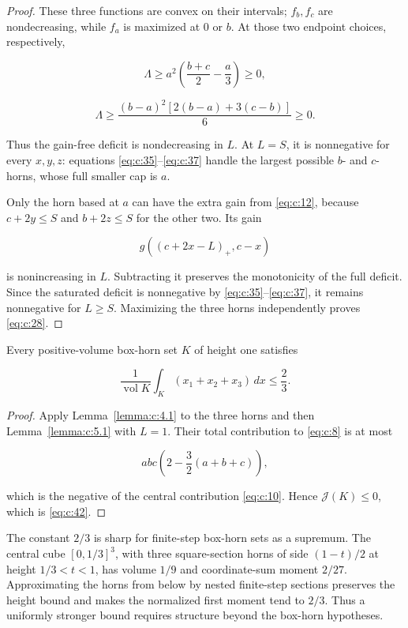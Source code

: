 \begin{proof}
These three functions are convex on their intervals; \(f_b,f_c\) are
nondecreasing, while \(f_a\) is maximized at \(0\) or \(b\). At those two
endpoint choices, respectively,

\[
\Lambda\ge
a^2\left(\frac{b+c}{2}-\frac a3\right)\ge0,
\]

\begin{equation}
\Lambda\ge
\frac{(b-a)^2[2(b-a)+3(c-b)]}{6}\ge0.
\label{eq:c:41}
\end{equation}

Thus the gain-free deficit is nondecreasing in \(L\). At \(L=S\), it is
nonnegative for every \(x,y,z\): equations \eqref{eq:c:35}--\eqref{eq:c:37} handle the largest
possible \(b\)- and \(c\)-horns, whose full smaller cap is \(a\).

Only the horn based at \(a\) can have the extra gain from \eqref{eq:c:12}, because
\(c+2y\le S\) and \(b+2z\le S\) for the other two. Its gain

\[
g((c+2x-L)_+,c-x)
\]

is nonincreasing in \(L\). Subtracting it preserves the monotonicity of the
full deficit. Since the saturated deficit is nonnegative by \eqref{eq:c:35}--\eqref{eq:c:37}, it
remains nonnegative for \(L\ge S\). Maximizing the three horns independently
proves \eqref{eq:c:28}.
\end{proof}

\begin{theorem}\label{theorem:c:5.2}

Every positive-volume box-horn set \(K\) of height one satisfies

\begin{equation}
\boxed{
\frac1{\operatorname{vol}K}
\int_K(x_1+x_2+x_3)\,dx\le\frac23.
}
\label{eq:c:42}
\end{equation}

\end{theorem}
\begin{proof}

Apply Lemma~\ref{lemma:c:4.1} to the three horns and then Lemma~\ref{lemma:c:5.1} with \(L=1\).
Their total contribution to \eqref{eq:c:8} is at most

\[
abc\left(2-\frac32(a+b+c)\right),
\]

which is the negative of the central contribution \eqref{eq:c:10}. Hence
\(\mathcal J(K)\le0\), which is \eqref{eq:c:42}.
\end{proof}

\begin{remark}
The constant \(2/3\) is sharp for finite-step box-horn sets as a supremum.
The central cube \([0,1/3]^3\), with three square-section horns of side
\((1-t)/2\) at height \(1/3<t<1\), has volume \(1/9\) and coordinate-sum
moment \(2/27\). Approximating the horns from below by nested finite-step
sections preserves the height bound and makes the normalized first moment
tend to \(2/3\). Thus a uniformly stronger bound requires structure beyond
the box-horn hypotheses.
\end{remark}


